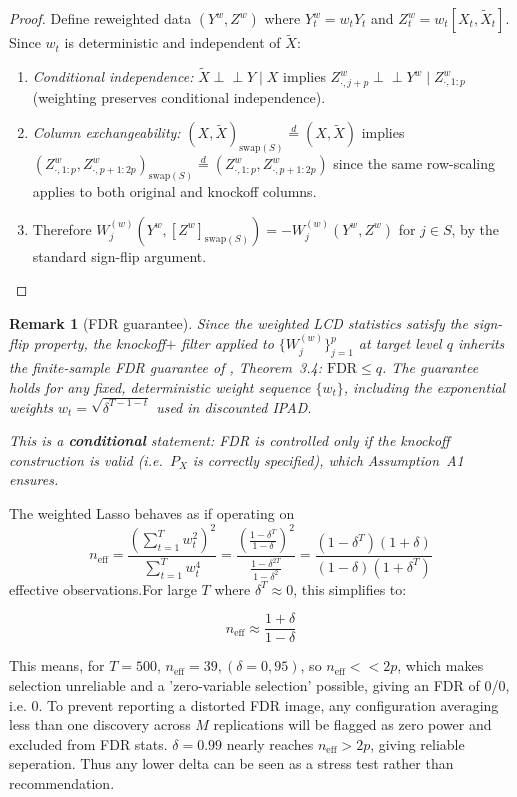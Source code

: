 \documentclass[12pt, a4paper]{article}
\newtheorem{remark}{Remark}
\begin{document}
\begin{proof}
Define reweighted data $(Y^w, Z^w)$ where $Y_t^w = w_t Y_t$ and $Z_t^w = w_t[X_t, \tilde{X}_t]$. Since $w_t$ is deterministic and independent of $\tilde{X}$:
\begin{enumerate}[label=(\roman*), itemsep=2pt]
    \item \emph{Conditional independence:} $\tilde{X} \perp\!\!\!\perp Y \mid X$ implies $Z^w_{\cdot,j+p} \perp\!\!\!\perp Y^w \mid Z^w_{\cdot,1:p}$ (weighting preserves conditional independence).
    \item \emph{Column exchangeability:} $(X,\tilde{X})_{\text{swap}(S)} \stackrel{d}{=} (X,\tilde{X})$ implies $(Z^w_{\cdot,1:p}, Z^w_{\cdot,p+1:2p})_{\text{swap}(S)} \stackrel{d}{=} (Z^w_{\cdot,1:p}, Z^w_{\cdot,p+1:2p})$ since the same row-scaling applies to both original and knockoff columns.
    \item Therefore $W_j^{(w)}(Y^w,[Z^w]_{\text{swap}(S)}) = -W_j^{(w)}(Y^w,Z^w)$ for $j \in S$, by the standard sign-flip argument. \qedhere
\end{enumerate}
\end{proof}
\begin{remark}[FDR guarantee]
Since the weighted LCD statistics satisfy the sign-flip property, the knockoff$+$ filter applied to $\{W_j^{(w)}\}_{j=1}^p$ at target level $q$ inherits the finite-sample FDR guarantee of \citet{candes2018}, Theorem~3.4: $\text{FDR} \leq q$. The guarantee holds for any fixed, deterministic weight sequence $\{w_t\}$, including the exponential weights $w_t = \sqrt{\delta^{T-1-t}}$ used in discounted IPAD. 

 This is a \textbf{conditional} statement: FDR is controlled only if the knockoff construction is valid (i.e.\ $P_X$ is correctly specified), which Assumption~A1 ensures.
\end{remark}

 The weighted Lasso behaves as if operating on
$$n_{\text{eff}} = \frac{\left(\sum_{t=1}^{T} w_t^2\right)^2}{\sum_{t=1}^{T} w_t^4} =
 \frac{\left(\frac{1-\delta^T}{1-\delta}\right)^2}{\frac{1-\delta^{2T}}{1-\delta^2}} =
 \frac{(1-\delta^T)(1+\delta)}{(1-\delta)(1+\delta^T)}$$
effective observations.For large $T$ where $\delta^T \approx 0$, this simplifies to:

 $$n_{\text{eff}} \approx \frac{1+\delta}{1-\delta}$$

This means, for $T=500$, $n_{\text{eff}} = 39, (\delta =0,95)$, so $n_{\text{eff}} << 2p$, which makes selection unreliable and a 'zero-variable selection' possible, giving an FDR of 0/0, i.e. 0. To prevent reporting a distorted FDR image, any configuration averaging less than one discovery across $M$ replications will be flagged as zero power and excluded from FDR stats. $\delta = 0.99$ nearly reaches $n_{\text{eff}} > 2p$, giving reliable seperation. Thus any lower delta can be seen as a stress test rather than recommendation. 
\end{document}
